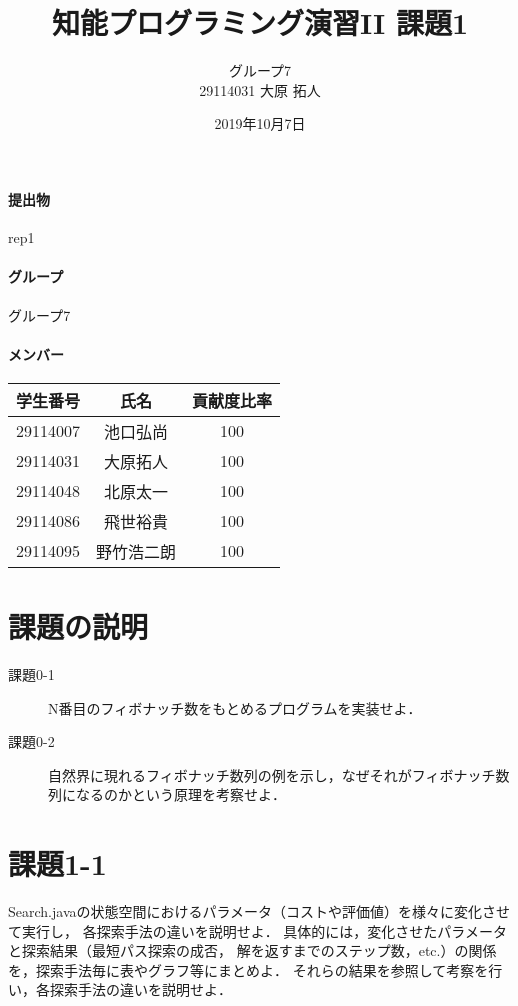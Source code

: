 \documentclass{jarticle}
\title{知能プログラミング演習II 課題1}
\author{グループ7\\
  29114031 大原 拓人\\
}
\date{2019年10月7日}
\begin{document}
\maketitle

\paragraph{提出物} rep1
\paragraph{グループ} グループ7
\paragraph{メンバー}
\begin{tabular}{|c|c|c|}
  \hline
  学生番号&氏名&貢献度比率\\
  \hline\hline
  29114007&池口弘尚&100\\
  \hline
  29114031&大原拓人&100\\
  \hline
  29114048&北原太一&100\\
  \hline
  29114086&飛世裕貴&100\\
  \hline
  29114095&野竹浩二朗&100\\
\end{tabular}

\section{課題の説明}
\begin{description}
\item[課題0-1] N番目のフィボナッチ数をもとめるプログラムを実装せよ．
\item[課題0-2] 自然界に現れるフィボナッチ数列の例を示し，なぜそれがフィボナッチ数列になるのかという原理を考察せよ．
\end{description}


\section{課題1-1}
\begin{screen}
  Search.javaの状態空間におけるパラメータ（コストや評価値）を様々に変化させて実行し，
  各探索手法の違いを説明せよ．
  具体的には，変化させたパラメータと探索結果（最短パス探索の成否，
  解を返すまでのステップ数，etc.）の関係を，探索手法毎に表やグラフ等にまとめよ．
  それらの結果を参照して考察を行い，各探索手法の違いを説明せよ．
\end{screen}
\end{document}
